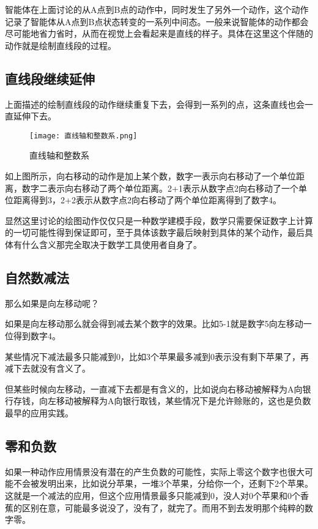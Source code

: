 \documentclass[12pt,oneside]{book}
\begin{document}
智能体在上面讨论的从A点到B点的动作中，同时发生了另外一个动作，这个动作记录了智能体从A点到B点状态转变的一系列中间态。一般来说智能体的动作都会尽可能地省力省时，从而在视觉上会看起来是直线的样子。具体在这里这个伴随的动作就是绘制直线段的过程。

\subsection{直线段继续延伸}
上面描述的绘制直线段的动作继续重复下去，会得到一系列的点，这条直线也会一直延伸下去。

\begin{figure}[H]
\centering
\texttt{[image: 直线轴和整数系.png]}
\caption{直线轴和整数系}
\end{figure}

如上图所示，向右移动的动作是加上某个数，数字一表示向右移动了一个单位距离，数字二表示向右移动了两个单位距离。2+1表示从数字点2向右移动了一个单位距离得到3，2+2表示从数字点2向右移动了两个单位距离得到了数字4。

显然这里讨论的绘图动作仅仅只是一种数学建模手段，数学只需要保证数字上计算的一切可能性得到保证即可，至于具体该数字最后映射到具体的某个动作，最后具体有什么含义那完全取决于数学工具使用者自身了。



\subsection{自然数减法}
那么如果是向左移动呢？

如果是向左移动那么就会得到减去某个数字的效果。比如5-1就是数字5向左移动一位得到数字4。

某些情况下减法最多只能减到0，比如3个苹果最多减到0表示没有剩下苹果了，再减下去就没有含义了。

但某些时候向左移动，一直减下去都是有含义的，比如说向右移动被解释为A向银行存钱，向左移动被解释为A向银行取钱，某些情况下是允许赊账的，这也是负数最早的应用实践。


\subsection{零和负数}
如果一种动作应用情景没有潜在的产生负数的可能性，实际上零这个数字也很大可能不会被发明出来，比如说分苹果，一堆3个苹果，分给你一个，还剩下2个苹果。这就是一个减法的应用，但这个应用情景最多只能减到0，没人对0个苹果和0个香蕉的区别在意，可能最多说没了，没有了，就完了。而用不到去发明那个纯粹的数字零。
\end{document}

